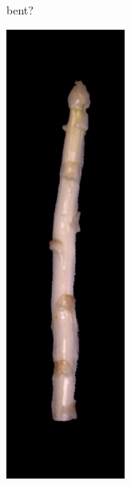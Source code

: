 \begin{figure}[!htb]
\begin{subfigure}{0.3\textwidth}
		\caption{bent?}
	\end{subfigure}
	\begin{subfigure}{0.3\textwidth}
		\includegraphics[width=0.80\linewidth]{Figures/chapter03/diff-img-flower-rust.png}

\end{subfigure}
\end{figure}
